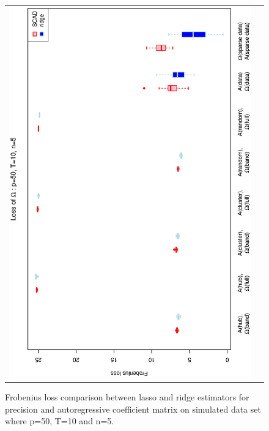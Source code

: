 \documentclass[a4paper]{article}
\begin{document}
\begin{figure}[h!]
\begin{tabular}{cc}
\includegraphics[scale=0.5,angle=270]{LossOmega50T10N5.eps}\\
\end{tabular}
\caption{Frobenius loss comparison between lasso and ridge estimators for precision and autoregressive coefficient matrix on simulated data set where p=50, T=10 and n=5.}
\label{fig:Loss50T10N5}
\end{figure}
 
\end{document}
